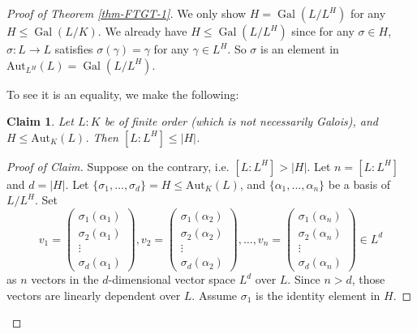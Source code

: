 \documentclass[11pt]{book}
\newtheorem*{claim}{Claim}
\begin{document}
\begin{proof}[Proof of Theorem \ref{thm-FTGT-1}]
    We only show $H=\operatorname{Gal}(L /L^{H})$ for any $H\leq \operatorname{Gal}(L /K)$. We already have $H\leq \operatorname{Gal}(L /L^{H})$ since for any $\sigma \in H$, $\sigma:L\to L$ satisfies $\sigma(\gamma)=\gamma$ for any $\gamma\in L^{H}$. So $\sigma$ is an element in $\mathrm{Aut}_{L^{H}}(L)=\operatorname{Gal}(L /L^{H})$. 

    To see it is an equality, we make the following: 
    
    \begin{claim}
    Let $L : K$ be of finite order (which is not necessarily Galois), and $H\leq \mathrm{Aut}_{K}(L)$. Then $[L:L^{H}]\leq \left| H \right| $.
    \end{claim}
    \begin{proof}[Proof of Claim]
        Suppose on the contrary, i.e. $[L:L^{H}]>\left| H \right| $. Let $n=[L:L^{H}]$ and $d=\left| H \right| $. Let $\{\sigma_{1},\dots,\sigma_{d}\}=H\leq \mathrm{Aut}_{K}(L)$,  and $\{\alpha_{1},\dots, \alpha_{n}\}$ be a basis of $L /L^{H}$. Set 
        \[
        v_{1}=\begin{pmatrix}
            \sigma_{1}(\alpha_{1})\\
            \sigma_{2}(\alpha_{1})\\
            \vdots\\
            \sigma_{d}(\alpha_{1})
        \end{pmatrix},
        v_{2}=\begin{pmatrix}
            \sigma_{1}(\alpha_{2})\\
            \sigma_{2}(\alpha_{2})\\
            \vdots\\
            \sigma_{d}(\alpha_{2})
        \end{pmatrix},
        \dots, 
        v_{n}=\begin{pmatrix}
            \sigma_{1}(\alpha_{n})\\
            \sigma_{2}(\alpha_{n})\\
            \vdots\\
            \sigma_{d}(\alpha_{n})
        \end{pmatrix}
        \in L^{d}
        \] 
        as $n$ vectors in the $d$-dimensional vector space $L^{d}$ over $L$. Since $n>d$, those vectors are linearly dependent over $L$. Assume $\sigma_{1}$ is the identity element in $H$. 


\end{proof}
\end{proof}
\end{document}
